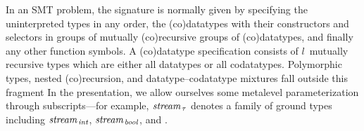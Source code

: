 In an SMT problem, the signature is normally given by specifying the
uninterpreted types in any order, the (co)datatypes with their constructors
and selectors in groups of mutually (co)recursive groups of (co)datatypes, and
finally any other function symbols.
%
A (co)datatype specification consists of $l$~mutually recursive types which are
either all datatypes or all codatatypes. Polymorphic types, nested
(co)recursion, and datatype--codatatype mixtures fall outside this fragment%
In the presentation, we allow ourselves some metalevel parameterization
through subscripts---for example, $\textit{stream}_{\,\tau}$ denotes a
family of ground types including
$\textit{stream}_{\,\textit{int}}$, $\textit{stream}_{\,\textit{bool}}$,
and .

\newcommand\elll{\kern.18ex l\kern.11ex}
\newcommand\elllx{\kern.11ex l\kern.18ex}

